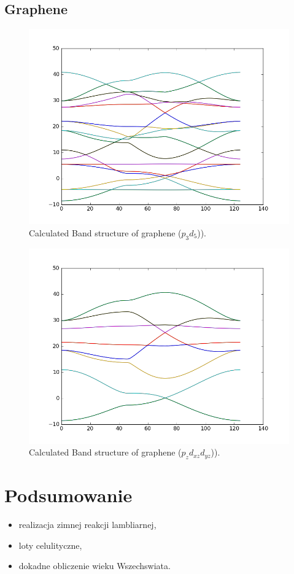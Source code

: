 \documentclass{my_pracamgr}
\begin{document}
\section{Graphene}
\begin{figure}[h] 
\begin{center}
  \includegraphics[width=0.55\linewidth]{img/graphene_pd_soc}
  \caption{Calculated Band structure of graphene ($p_3d_5$)).}
\end{center}
\end{figure}
\begin{figure}[h] 
\begin{center}
  \includegraphics[width=0.55\linewidth]{img/graphene_pd_soc3}
  \caption{Calculated Band structure of graphene ($p_zd_{xz}d_{yz}$)).}
\end{center}
\end{figure}

\chapter{Podsumowanie}

\begin{itemize}
\item realizacja zimnej reakcji lambliarnej,
\item loty celulityczne,
\item dokadne obliczenie wieku Wszechswiata.
\end{itemize}
\end{document}
